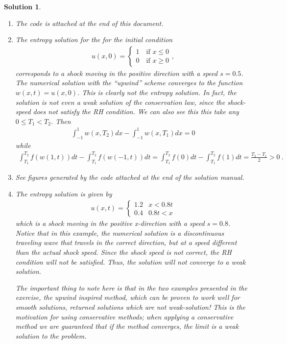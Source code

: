 \documentclass[10pt,letterpaper]{article}
\newcommand{\frb}[1]{ \left(  {#1} \right) }
\theoremstyle{break}
\newtheorem{solution}{Solution}
\begin{document}
\begin{solution}
	\begin{enumerate}

		\item The code is attached at the end of this document.
		\item The entropy solution for the for the initial condition
		\begin{gather}
		u(x,0) = \begin{cases} 1 \quad \text{if } x\leq 0 \\0 \quad \text{if } x\geq 0 \end{cases},
		\end{gather}
		corresponds to a shock moving in the positive direction with a speed $s=0.5$.
		The numerical solution with the ``upwind'' scheme converges to the function $w(x,t)=u(x,0)$. This is clearly not the entropy solution. In fact, the solution is not even a weak solution of the conservation law, since the shock-speed does not satisfy the RH condition. We can also see this
		this take any $0\leq T_{1}<T_{2}$. Then 
		\begin{gather}
			\int_{-1}^{1}w\frb{x,T_{2}}dx-\int_{-1}^{1}w\frb{x,T_{1}}dx=0
		\end{gather}
		while
		\begin{gather}
			\int_{T_{1}}^{T_{2}}f\frb{w\frb{1,t}}dt -\int_{T_{1}}^{T_{2}}f\frb{w\frb{-1,t}}dt
				=\int_{T_{1}}^{T_{2}}f\frb{0}dt-\int_{T_{1}}^{T_{2}}f\frb{1}dt
				=\frac{T_{2}-T_{1}}{2}>0\ .
		\end{gather}
		
		\item
		See figures generated by the code attached at the end of the solution manual.
		
		\item
		The entropy solution is given by 
		\begin{gather}
			u(x,t)=\begin{cases}
				1.2 & x<0.8t\\
				0.4 & 0.8t<x
			\end{cases}
		\end{gather}
		which is a shock moving in the positive x-direction with a speed $s=0.8$. 
		Notice that in this example, the numerical solution is a discontinuous traveling wave that travels in the correct direction, but at a speed different than the actual shock speed. Since the shock speed is not correct, the RH condition will not be satisfied. Thus, the solution will not converge to a weak solution. 
		
		The important thing to note here is that in the two examples presented in the exercise, the upwind inspired method, which can be proven to work well for smooth solutions, returned solutions which are not weak-solution! This is the motivation for using conservative methods; when applying a conservative method we are guaranteed that if the method converges, the limit is a weak solution to the problem.
	\end{enumerate}
\end{solution}
\end{document}
